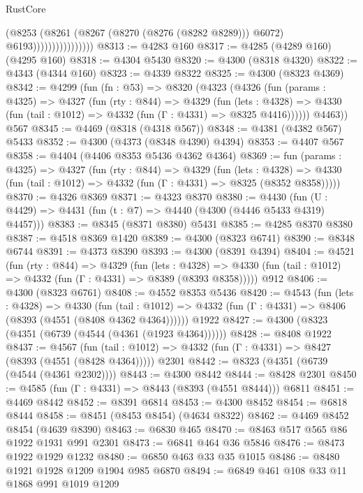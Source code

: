 \begin{lexlean}{RustCore}
\begin{coremodule}
                                (@8253
                                  (@8261
                                    (@8267 (@8270 (@8276 (@8282 @8289))) @6072)
                                    @6193))))))))))))))))
@8313 := @4283 @160
@8317 := @4285 (@4289 @160) (@4295 @160)
@8318 := @4304 @5430
@8320 := @4300 (@8318 @4320)
@8322 := @4343 (@4344 @160)
@8323 := @4339 @8322
@8325 := @4300 (@8323 @4369)
@8342 := @4299
    (fun (fn : @53) =>
    @8320
      (@4323
        (@4326
          (fun (params : @4325) =>
          @4327
            (fun (rty : @844) =>
            @4329
              (fun (lets : @4328) =>
              @4330 (fun (tail : @1012) => @4332 (fun (Γ : @4331) => @8325 @4416))))))
        @4463))
    @567
@8345 := @4469 (@8318 (@4318 @567))
@8348 := @4381 (@4382 @567) @5433
@8352 := @4300 (@4373 (@8348 @4390) @4394)
@8353 := @4407 @567
@8358 := @4404 (@4406 @8353 @5436 @4362 @4364)
@8369 := fun (params : @4325) =>
  @4327
    (fun (rty : @844) =>
    @4329
      (fun (lets : @4328) =>
      @4330 (fun (tail : @1012) => @4332 (fun (Γ : @4331) => @8325 (@8352 @8358)))))
@8370 := @4326 @8369
@8371 := @4323 @8370
@8380 := @4430 (fun (U : @4429) => @4431 (fun (t : @7) => @4440 (@4300 (@4446 @5433 @4319) @4457)))
@8383 := @8345 (@8371 @8380) @5431
@8385 := @4285 @8370 @8380
@8387 := @4518 @8369 @1420
@8389 := @4300 (@8323 @6741)
@8390 := @8348 @6744
@8391 := @4373 @8390
@8393 := @4300 (@8391 @4394)
@8404 := @4521
    (fun (rty : @844) =>
    @4329
      (fun (lets : @4328) =>
      @4330 (fun (tail : @1012) => @4332 (fun (Γ : @4331) => @8389 (@8393 @8358)))))
    @912
@8406 := @4300 (@8323 @6761)
@8408 := @4552 @8353 @5436
@8420 := @4543
    (fun (lets : @4328) =>
    @4330
      (fun (tail : @1012) => @4332 (fun (Γ : @4331) => @8406 (@8393 (@4551 (@8408 @4362 @4364))))))
    @1922
@8427 := @4300 (@8323 (@4351 (@6739 (@4544 (@4361 (@1923 @4364))))))
@8428 := @8408 @1922
@8437 := @4567
    (fun (tail : @1012) => @4332 (fun (Γ : @4331) => @8427 (@8393 (@4551 (@8428 @4364)))))
    @2301
@8442 := @8323 (@4351 (@6739 (@4544 (@4361 @2302))))
@8443 := @4300 @8442
@8444 := @8428 @2301
@8450 := @4585 (fun (Γ : @4331) => @8443 (@8393 (@4551 @8444))) @6811
@8451 := @4469 @8442
@8452 := @8391 @6814
@8453 := @4300 @8452
@8454 := @6818 @8444
@8458 := @8451 (@8453 @8454) (@4634 @8322)
@8462 := @4469 @8452 @8454 (@4639 @8390)
@8463 := @6830 @465
@8470 := @8463 @517 @565 @86 @1922 @1931 @991 @2301
@8473 := @6841 @464 @36 @5846
@8476 := @8473 @1922 @1929 @1232
@8480 := @6850 @463 @33 @35 @1015
@8486 := @8480 @1921 @1928 @1209 @1904 @985 @6870
@8494 := @6849 @461 @108 @33 @11 @1868 @991 @1019 @1209

\end{coremodule}
\end{lexlean}

